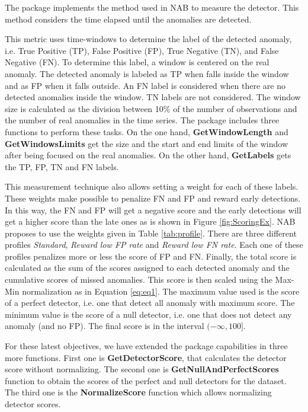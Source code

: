 \documentclass[a4paper]{article}\usepackage[]{graphicx}\usepackage[]{color}
\begin{document}
The  package implements the method used in NAB \cite{7424283} to measure the detector. This method considers the time elapsed until the anomalies are detected.

This metric uses time-windows to determine the label of the detected anomaly, i.e. True Positive (TP), False Positive (FP), True Negative (TN), and False Negative (FN). To determine this label, a window is centered on the real anomaly. The detected anomaly is labeled as TP when falls inside the window and as FP when it falls outside. An FN label is considered when there are no detected anomalies inside the window. TN labels are not considered. The window size is calculated as the division between 10\% of the number of observations and the number of real anomalies in the time series. The package includes three functions to perform these tasks. On the one hand, \textbf{GetWindowLength} and \textbf{GetWindowsLimits} get the size and the start and end limits of the window after being focused on the real anomalies. On the other hand, \textbf{GetLabels} gets the TP, FP, TN and FN labels.

This measurement technique also allows setting a weight for each of these labels. These weights make possible to penalize FN and FP and reward early detections. In this way, the FN and FP will get a negative score and the early detections will get a higher score than the late ones as is shown in Figure \ref{fig:ScoringEx}. NAB \cite{7424283} proposes to use the weights given in Table \ref{tab:profile}. There are three different profiles \emph{Standard}, \emph{Reward low FP rate} and \emph{Reward low FN rate}. Each one of these profiles penalizes more or less the score of FP and FN. Finally, the total score is calculated as the sum of the scores assigned to each detected anomaly and the cumulative scores of missed anomalies. This score is then scaled using the Max-Min normalization as in Equation \ref{eq:eq1}. The maximum value used is the score of a perfect detector, i.e. one that detect all anomaly with maximum score. The minimum value is the score of a null detector, i.e. one that does not detect any anomaly (and no FP). The final score is in the interval $(-\infty, 100]$.

For these latest objectives, we have extended the package capabilities in three more functions. First one is \textbf{GetDetectorScore}, that calculates the detector score without normalizing. The second one is \textbf{GetNullAndPerfectScores} function to obtain the scores of the perfect and null detectors for the dataset. The third one is the \textbf{NormalizeScore} function which allows normalizing detector scores.
\end{document}
